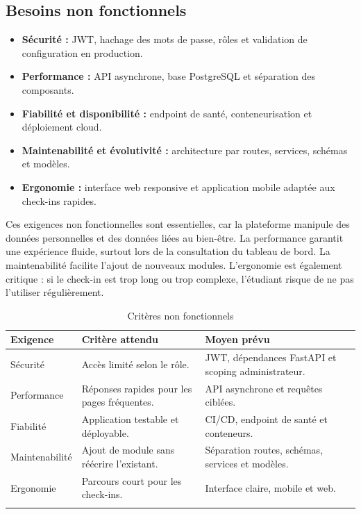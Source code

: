 \documentclass{rapportENSET}
\begin{document}
\subsection{Besoins non fonctionnels}
\begin{itemize}
    \item \textbf{Sécurité :} JWT, hachage des mots de passe, rôles et validation de configuration en production.
    \item \textbf{Performance :} API asynchrone, base PostgreSQL et séparation des composants.
    \item \textbf{Fiabilité et disponibilité :} endpoint de santé, conteneurisation et déploiement cloud.
    \item \textbf{Maintenabilité et évolutivité :} architecture par routes, services, schémas et modèles.
    \item \textbf{Ergonomie :} interface web responsive et application mobile adaptée aux check-ins rapides.
\end{itemize}

Ces exigences non fonctionnelles sont essentielles, car la plateforme manipule des données personnelles et des données liées au bien-être. La performance garantit une expérience fluide, surtout lors de la consultation du tableau de bord. La maintenabilité facilite l'ajout de nouveaux modules. L'ergonomie est également critique : si le check-in est trop long ou trop complexe, l'étudiant risque de ne pas l'utiliser régulièrement.

\begin{longtable}{@{}L{0.28\textwidth}L{0.34\textwidth}L{0.28\textwidth}@{}}
\toprule
\textbf{Exigence} & \textbf{Critère attendu} & \textbf{Moyen prévu} \\
\midrule
\endhead
Sécurité & Accès limité selon le rôle. & JWT, dépendances FastAPI et scoping administrateur. \\
Performance & Réponses rapides pour les pages fréquentes. & API asynchrone et requêtes ciblées. \\
Fiabilité & Application testable et déployable. & CI/CD, endpoint de santé et conteneurs. \\
Maintenabilité & Ajout de module sans réécrire l'existant. & Séparation routes, schémas, services et modèles. \\
Ergonomie & Parcours court pour les check-ins. & Interface claire, mobile et web. \\
\bottomrule
\caption{Critères non fonctionnels}
\end{longtable}
\end{document}
